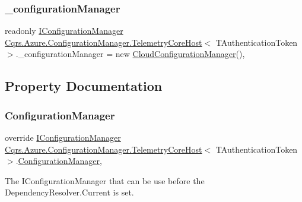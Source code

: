 \subsubsection{\texorpdfstring{\+\_\+configuration\+Manager}{\_configurationManager}}
{\footnotesize\ttfamily readonly \hyperlink{interfaceCqrs_1_1Configuration_1_1IConfigurationManager}{I\+Configuration\+Manager} \hyperlink{classCqrs_1_1Azure_1_1ConfigurationManager_1_1TelemetryCoreHost}{Cqrs.\+Azure.\+Configuration\+Manager.\+Telemetry\+Core\+Host}$<$ T\+Authentication\+Token $>$.\+\_\+configuration\+Manager = new \hyperlink{classCqrs_1_1Azure_1_1ConfigurationManager_1_1CloudConfigurationManager}{Cloud\+Configuration\+Manager}()\hspace{0.3cm}{\ttfamily [static]}, {\ttfamily [protected]}}



\subsection{Property Documentation}
\mbox{\label{classCqrs_1_1Azure_1_1ConfigurationManager_1_1TelemetryCoreHost_a2878745a14876ad8e3914a548970232d_a2878745a14876ad8e3914a548970232d}} 
\subsubsection{\texorpdfstring{Configuration\+Manager}{ConfigurationManager}}
{\footnotesize\ttfamily override \hyperlink{interfaceCqrs_1_1Configuration_1_1IConfigurationManager}{I\+Configuration\+Manager} \hyperlink{classCqrs_1_1Azure_1_1ConfigurationManager_1_1TelemetryCoreHost}{Cqrs.\+Azure.\+Configuration\+Manager.\+Telemetry\+Core\+Host}$<$ T\+Authentication\+Token $>$.\hyperlink{classCqrs_1_1Configuration_1_1ConfigurationManager}{Configuration\+Manager}\hspace{0.3cm}{\ttfamily [get]}, {\ttfamily [protected]}}



The I\+Configuration\+Manager that can be use before the Dependency\+Resolver.\+Current is set. 

